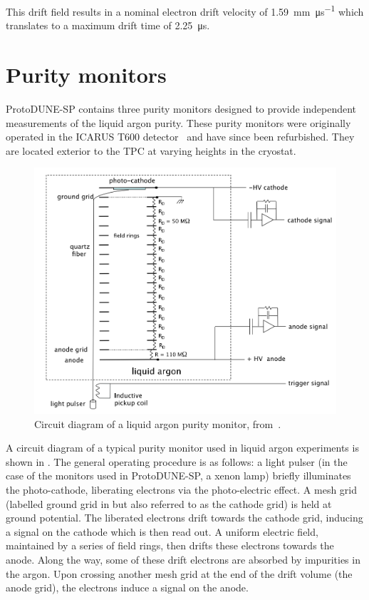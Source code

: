 This drift field results in a nominal electron drift velocity of \SI{1.59}{\mm\per\micro\second} which translates to a maximum drift time of \SI{2.25}{\micro\second}.

\section{Purity monitors}
\label{sec:protodune:prms}

ProtoDUNE-SP contains three purity monitors designed to provide independent measurements of the liquid argon purity.
These purity monitors were originally operated in the ICARUS T600 detector~\cite{icarus} and have since been refurbished.
They are located exterior to the TPC at varying heights in the cryostat.

\begin{figure}[h]
	\centering
	\includegraphics[width=.6\linewidth]{files/figures/protodune_detector/prmDiag}
	\caption[Circuit diagram of a typical purity monitor used in a liquid argon experiment]{Circuit diagram of a liquid argon purity monitor, from~\cite{Adamowski_2014}.}
	\label{fig:prmDiag}
\end{figure} 

A circuit diagram of a typical purity monitor used in liquid argon experiments is shown in .
The general operating procedure is as follows: a light pulser (in the case of the monitors used in ProtoDUNE-SP, a xenon lamp) briefly illuminates the photo-cathode, liberating electrons via the photo-electric effect.
A mesh grid (labelled ground grid in  but also referred to as the cathode grid) is held at ground potential.
The liberated electrons drift towards the cathode grid, inducing a signal on the cathode which is then read out.
A uniform electric field, maintained by a series of field rings, then drifts these electrons towards the anode.
Along the way, some of these drift electrons are absorbed by impurities in the argon.
Upon crossing another mesh grid at the end of the drift volume (the anode grid), the electrons induce a signal on the anode.


